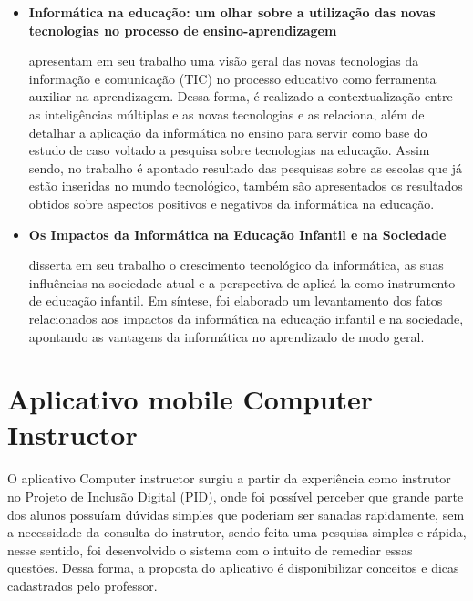\begin{itemize}

\item \textbf{Informática na educação: um olhar sobre a utilização das novas tecnologias no processo de ensino-aprendizagem}

 apresentam em seu trabalho uma visão geral das novas tecnologias da informação e comunicação (TIC) no processo educativo como ferramenta auxiliar na aprendizagem. Dessa forma, é realizado a contextualização entre as inteligências múltiplas e as novas tecnologias e as relaciona, além de detalhar a aplicação da informática no ensino para servir como base do estudo de caso voltado a pesquisa sobre tecnologias na educação. Assim sendo, no trabalho é apontado resultado das pesquisas sobre as escolas que já estão inseridas no mundo tecnológico, também são apresentados os resultados obtidos sobre aspectos positivos e negativos da informática na educação.

\item \textbf{Os Impactos da Informática na Educação Infantil e na Sociedade}

 disserta em seu trabalho o crescimento tecnológico da informática, as suas influências na sociedade atual e a perspectiva de aplicá-la como instrumento de educação infantil. Em síntese, foi elaborado um levantamento dos fatos relacionados aos impactos da informática na educação infantil e na sociedade, apontando as vantagens da informática no aprendizado de modo geral.

\end{itemize}


\chapter{Aplicativo mobile Computer Instructor}
\label{chap:aplicativoComputerInstructor}
O aplicativo  Computer instructor surgiu a partir da experiência como instrutor no Projeto de Inclusão Digital (PID), onde foi possível perceber que grande parte dos alunos possuíam dúvidas simples que poderiam ser sanadas rapidamente, sem a necessidade da consulta do instrutor, sendo feita uma pesquisa simples e rápida, nesse sentido, foi desenvolvido o sistema com o intuito de remediar essas questões. Dessa forma, a proposta do aplicativo é disponibilizar conceitos e dicas cadastrados pelo professor.


